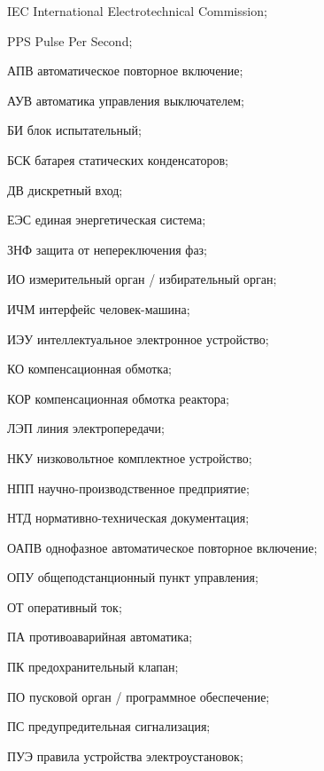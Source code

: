 \begin{list}{}%
{%
  \setlength{\labelwidth}{\abbrwidth}%
  \setlength{\labelsep}{0pt}%
  \setlength{\leftmargin}{\dimexpr\labelwidth+\labelsep\relax}%
  \setlength{\itemindent}{0pt}%
  \setlength{\parsep}{0pt}%
  \setlength{\itemsep}{0pt}
  \renewcommand{\makelabel}[1]{#1 --\hspace{\abbrgap}}%
}
\item[IEC]  International Electrotechnical Commission;
\item[PPS] Pulse Per Second;
\item[АПВ] автоматическое повторное включение;
\item[АУВ] автоматика управления выключателем;
\item[БИ] блок испытательный;
\item[БСК] батарея статических конденсаторов;
\item[ДВ] дискретный вход;
\item[ЕЭС] единая энергетическая система;
\item[ЗНФ] защита от непереключения фаз;
\item[ИО] измерительный орган / избирательный орган;
\item[ИЧМ] интерфейс человек-машина;
\item[ИЭУ] интеллектуальное электронное устройство;
\item[КО] компенсационная обмотка;
\item[КОР] компенсационная обмотка реактора;
\item[ЛЭП] линия электропередачи;
\item[НКУ] низковольтное комплектное устройство;
\item[НПП] научно-производственное предприятие;
\item[НТД] нормативно-техническая документация;
\item[ОАПВ] однофазное автоматическое повторное включение;
\item[ОПУ] общеподстанционный пункт управления;
\item[ОТ] оперативный ток;
\item[ПА] противоаварийная автоматика;
\item[ПК] предохранительный клапан;
\item[ПО] пусковой орган / программное обеспечение;
\item[ПС] предупредительная сигнализация;
\item[ПУЭ] правила устройства электроустановок;

\end{list}
